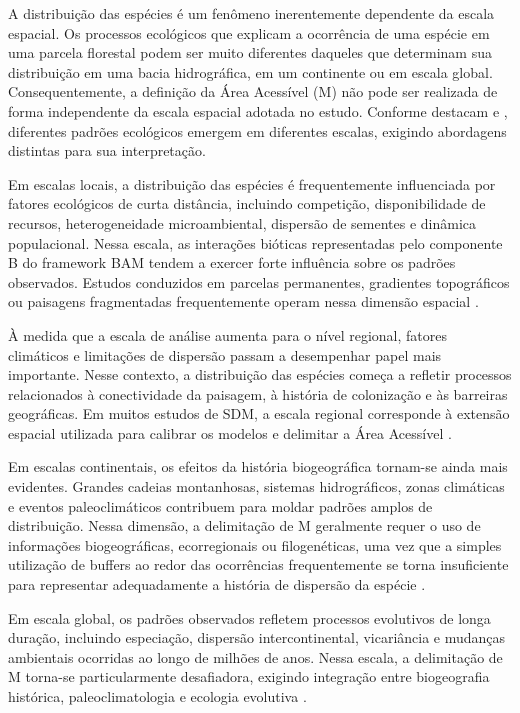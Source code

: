 A distribuição das espécies é um fenômeno inerentemente dependente da escala espacial. Os processos ecológicos que explicam a ocorrência de uma espécie em uma parcela florestal podem ser muito diferentes daqueles que determinam sua distribuição em uma bacia hidrográfica, em um continente ou em escala global. Consequentemente, a definição da Área Acessível (M) não pode ser realizada de forma independente da escala espacial adotada no estudo. Conforme destacam \textcite{Levin1992} e \textcite{Wiens1989}, diferentes padrões ecológicos emergem em diferentes escalas, exigindo abordagens distintas para sua interpretação.

Em escalas locais, a distribuição das espécies é frequentemente influenciada por fatores ecológicos de curta distância, incluindo competição, disponibilidade de recursos, heterogeneidade microambiental, dispersão de sementes e dinâmica populacional. Nessa escala, as interações bióticas representadas pelo componente B do framework BAM tendem a exercer forte influência sobre os padrões observados. Estudos conduzidos em parcelas permanentes, gradientes topográficos ou paisagens fragmentadas frequentemente operam nessa dimensão espacial \parencite{Wiens1989,Guisan2017}.

À medida que a escala de análise aumenta para o nível regional, fatores climáticos e limitações de dispersão passam a desempenhar papel mais importante. Nesse contexto, a distribuição das espécies começa a refletir processos relacionados à conectividade da paisagem, à história de colonização e às barreiras geográficas. Em muitos estudos de SDM, a escala regional corresponde à extensão espacial utilizada para calibrar os modelos e delimitar a Área Acessível \parencite{Franklin2010,Peterson2011}.

Em escalas continentais, os efeitos da história biogeográfica tornam-se ainda mais evidentes. Grandes cadeias montanhosas, sistemas hidrográficos, zonas climáticas e eventos paleoclimáticos contribuem para moldar padrões amplos de distribuição. Nessa dimensão, a delimitação de M geralmente requer o uso de informações biogeográficas, ecorregionais ou filogenéticas, uma vez que a simples utilização de buffers ao redor das ocorrências frequentemente se torna insuficiente para representar adequadamente a história de dispersão da espécie \parencite{Barve2011,Guisan2017}.

Em escala global, os padrões observados refletem processos evolutivos de longa duração, incluindo especiação, dispersão intercontinental, vicariância e mudanças ambientais ocorridas ao longo de milhões de anos. Nessa escala, a delimitação de M torna-se particularmente desafiadora, exigindo integração entre biogeografia histórica, paleoclimatologia e ecologia evolutiva \parencite{Wiens2005,Peterson2011}.

